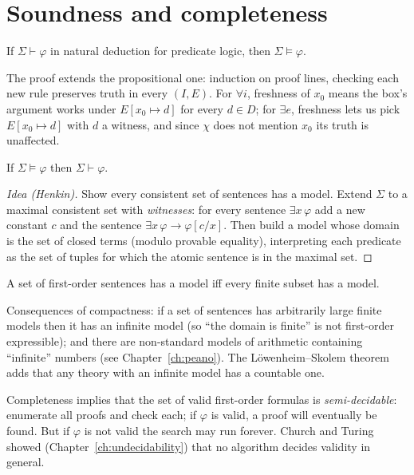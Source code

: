 \section{Soundness and completeness}

\begin{theorem}[Soundness]
If $\Sigma\vdash\varphi$ in natural deduction for predicate logic, then
$\Sigma\models\varphi$.
\end{theorem}
The proof extends the propositional one: induction on proof lines, checking each new rule
preserves truth in every $(I,E)$. For $\forall i$, freshness of $x_0$ means the box's
argument works under $E[x_0\mapsto d]$ for every $d\in D$; for $\exists e$, freshness lets
us pick $E[x_0\mapsto d]$ with $d$ a witness, and since $\chi$ does not mention $x_0$ its
truth is unaffected.

\begin{theorem}
If $\Sigma\models\varphi$ then $\Sigma\vdash\varphi$.
\end{theorem}
\begin{proof}[Idea (Henkin)]
Show every consistent set of sentences has a model. Extend $\Sigma$ to a maximal
consistent set with \emph{witnesses}: for every sentence $\exists x\,\varphi$ add a new
constant $c$ and the sentence $\exists x\,\varphi\to\varphi[c/x]$. Then build a model whose
domain is the set of closed terms (modulo provable equality), interpreting each predicate
as the set of tuples for which the atomic sentence is in the maximal set.
\end{proof}

\begin{corollary}[Compactness]
A set of first-order sentences has a model iff every finite subset has a model.
\end{corollary}

\begin{aside}
Consequences of compactness: if a set of sentences has arbitrarily large finite models then
it has an infinite model (so ``the domain is finite'' is not first-order expressible); and
there are non-standard models of arithmetic containing ``infinite'' numbers (see
Chapter~\ref{ch:peano}). The L\"owenheim--Skolem theorem adds that any theory with an
infinite model has a countable one.
\end{aside}

\begin{important}
Completeness implies that the set of valid first-order formulas is
\emph{semi-decidable}: enumerate all proofs and check each; if $\varphi$ is valid, a proof
will eventually be found. But if $\varphi$ is not valid the search may run forever.
Church and Turing showed (Chapter~\ref{ch:undecidability}) that no algorithm decides
validity in general.
\end{important}


